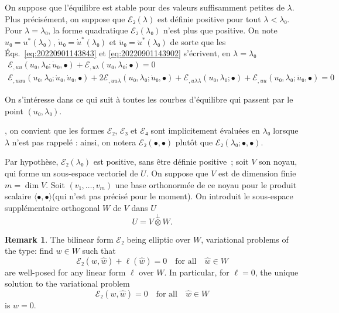 \documentclass[12pt, final]{scrartcl}
\theoremstyle{definition}
\newtheorem{remark}{Remark}
\newcommand{\E}{\mathcal E}
\begin{document}
On suppose que l'équilibre est stable pour des valeurs suffisamment petites de
$\lambda$. Plus précisément, on suppose que $\E₂(\lambda)$ est définie positive pour tout
$\lambda < \lambda₀$. Pour $\lambda = \lambda₀$, la forme quadratique $\E₂(\lambda₀)$ n'est plus que
positive. On note $u₀ = u^{\ast}(\lambda₀)$, $\dot{u}₀ = \dot{u}^\ast(\lambda₀)$ et
$\ddot{u}₀ = \ddot{u}^\ast(\lambda₀)$ de sorte que les
Éqs.~\eqref{eq:20220901143843} et \eqref{eq:20220901143902} s'écrivent, en
$\lambda = \lambda₀$
\begin{gather}
  \label{eq:20220901144331}
  \E_{,uu}(u₀, \lambda₀; \dot{u}₀, \bullet) + \E_{,u\lambda}(u₀, \lambda₀; \bullet) = 0\\
  \label{eq:20220901144335}
  \E_{,uuu}(u₀, \lambda₀; \dot{u}₀, \dot{u}₀, \bullet) + 2\E_{,uu\lambda}(u₀, \lambda₀; \dot{u}₀, \bullet) + \E_{,u\lambda\lambda}(u₀, \lambda₀; \bullet) + \E_{,uu}(u₀, \lambda₀; \ddot{u}₀, \bullet) = 0
\end{gather}

On s'intéresse dans ce qui suit à toutes les courbes d'équilibre qui passent par
le point $(u₀, \lambda₀)$.

, on
convient que les formes $\E₂$, $\E₃$ et $\E₄$ sont implicitement évaluées en
$\lambda₀$ lorsque $\lambda$ n'est pas rappelé : ainsi, on notera $\E₂(•, •)$ plutôt
que $\E₂(\lambda₀ ; •, •)$.

Par hypothèse, $\E₂(\lambda₀)$ est positive, sans être définie
positive~; soit $V$ son noyau, qui forme un sous-espace vectoriel de $U$. On
suppose que $V$ est de dimension finie $m = \dim V$. Soit
$(v₁, \ldots, v_m)$ une base orthonormée de ce noyau pour le produit scalaire
$〈 •, • 〉$(qui n'est pas précisé pour le moment). On introduit le
sous-espace supplémentaire orthogonal $W$ de $V$ dans $U$
\begin{equation}
  U = V \overset{\perp}{\otimes} W.
\end{equation}

\begin{remark}
  \label{rem:20220902095055}
  The bilinear form $\E₂$ being elliptic over $W$, variational problems of the
  type: find $w ∈ W$ such that
  \begin{equation}
    \E₂(w, \hat{w})+\ell(\hat{w}) = 0 \quad \text{for all} \quad \hat{w}∈W
  \end{equation}
  are well-posed for any linear form $\ell$ over $W$. In particular, for
  $\ell=0$, the unique solution to the variational problem
  \begin{equation}
    \E₂(w, \hat{w}) = 0 \quad \text{for all} \quad \hat{w}∈W
  \end{equation}
  is $w = 0$.
\end{remark}
\end{document}
